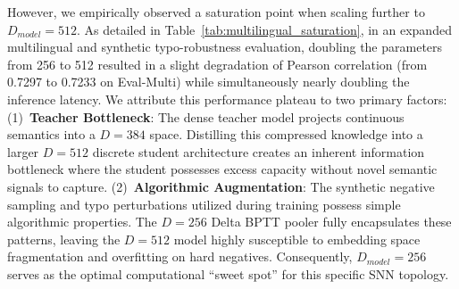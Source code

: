 \documentclass[10pt,a4paper,twoside]{article}
\begin{document}
\begin{table}[t!]
\begin{center}
{\caption{Dimensionality saturation on augmented multilingual data. The validation datasets evaluated here (Eval-Multi and All-STS-Teacher) reflect the augmented multilingual training distribution, which is distinct from the standard zero-shot STS benchmarks presented in Table~\ref{tab:main_results}.}\label{tab:multilingual_saturation}}


\end{center}
\end{table}

However, we empirically observed a saturation point when scaling further to $D_{model} = 512$. As detailed in Table~\ref{tab:multilingual_saturation}, in an expanded multilingual and synthetic typo-robustness evaluation, doubling the parameters from 256 to 512 resulted in a slight degradation of Pearson correlation (from 0.7297 to 0.7233 on Eval-Multi) while simultaneously nearly doubling the inference latency. We attribute this performance plateau to two primary factors: (1)~\textbf{Teacher Bottleneck}: The dense teacher model projects continuous semantics into a $D=384$ space. Distilling this compressed knowledge into a larger $D=512$ discrete student architecture creates an inherent information bottleneck where the student possesses excess capacity without novel semantic signals to capture. (2)~\textbf{Algorithmic Augmentation}: The synthetic negative sampling and typo perturbations utilized during training possess simple algorithmic properties. The $D=256$ Delta BPTT pooler fully encapsulates these patterns, leaving the $D=512$ model highly susceptible to embedding space fragmentation and overfitting on hard negatives. Consequently, $D_{model} = 256$ serves as the optimal computational ``sweet spot'' for this specific SNN topology.
\end{document}
